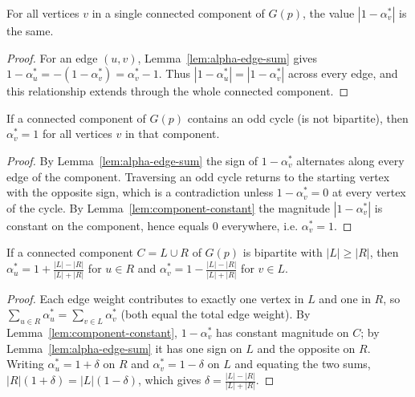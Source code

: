 \begin{lemma}
  \label{lem:component-constant}
  For all vertices $v$ in a single connected component of $G(p)$, the value
  $|1 - \alpha^*_v|$ is the same.
\end{lemma}
\begin{proof}
  For an edge $(u,v)$,
  Lemma~\ref{lem:alpha-edge-sum} gives $1 - \alpha^*_u = -(1 - \alpha^*_v)
  = \alpha^*_v - 1$. Thus $|1-\alpha^*_u| = |1-\alpha^*_v|$ across every edge,
  and this relationship extends through the whole connected component.
\end{proof}

\begin{lemma}[Non-bipartite components give $\alpha^* = 1$]
  \label{lem:nonbipartite-one}
  If a connected component of $G(p)$ contains an odd cycle (is not bipartite),
  then $\alpha^*_v = 1$ for all vertices $v$ in that component.
\end{lemma}
\begin{proof}
  By Lemma~\ref{lem:alpha-edge-sum} the sign of $1 - \alpha^*_v$ alternates along
  every edge of the component. Traversing an odd cycle returns to the starting
  vertex with the opposite sign, which is a contradiction unless
  $1 - \alpha^*_v = 0$ at every vertex of the cycle. By
  Lemma~\ref{lem:component-constant} the magnitude $|1-\alpha^*_v|$ is constant on
  the component, hence equals $0$ everywhere, i.e. $\alpha^*_v = 1$.
\end{proof}

\begin{lemma}
  \label{lem:bipartite-balance}
  If a connected component $C = L \cup R$ of $G(p)$ is bipartite with
  $|L| \ge |R|$, then $\alpha^*_u = 1 + \tfrac{|L|-|R|}{|L|+|R|}$ for $u \in R$
  and $\alpha^*_v = 1 - \tfrac{|L|-|R|}{|L|+|R|}$ for $v \in L$.
\end{lemma}
\begin{proof}
  Each edge weight contributes to exactly one vertex in $L$ and one in $R$, so
  $\sum_{u \in R} \alpha^*_u = \sum_{v \in L} \alpha^*_v$ (both equal the total
  edge weight). By Lemma~\ref{lem:component-constant}, $1 - \alpha^*_v$ has
  constant magnitude on $C$; by Lemma~\ref{lem:alpha-edge-sum} it has one sign on
  $L$ and the opposite on $R$. Writing $\alpha^*_u = 1 + \delta$ on $R$ and
  $\alpha^*_v = 1 - \delta$ on $L$ and equating the two sums,
  $|R|(1+\delta) = |L|(1-\delta)$, which gives
  $\delta = \tfrac{|L|-|R|}{|L|+|R|}$.
\end{proof}


